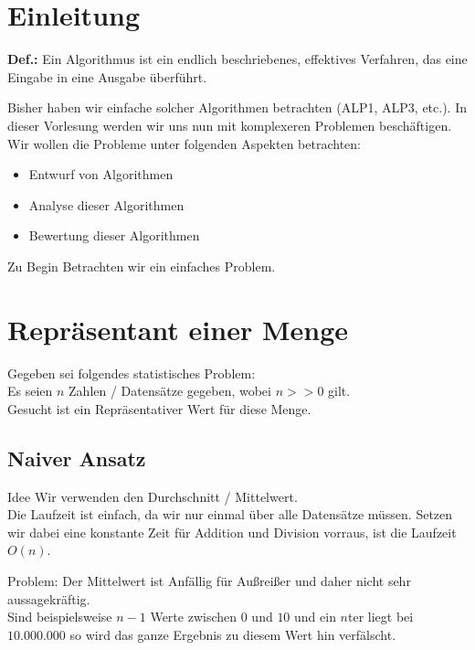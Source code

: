 \section{Einleitung}

\begin{description}

\item{\textbf{Def.:}} Ein Algorithmus ist ein endlich beschriebenes, effektives Verfahren, das eine Eingabe in eine Ausgabe überführt.

\end{description}

Bisher haben wir einfache solcher Algorithmen betrachten (ALP1, ALP3, etc.). In dieser Vorlesung werden wir uns nun mit komplexeren Problemen beschäftigen. Wir wollen die Probleme unter folgenden Aspekten betrachten:

\begin{itemize}

\item Entwurf von Algorithmen

\item Analyse dieser Algorithmen

\item Bewertung dieser Algorithmen

\end{itemize}

Zu Begin Betrachten wir ein einfaches Problem.

\section{Repräsentant einer Menge}

Gegeben sei folgendes statistisches Problem:\\
Es seien $n$ Zahlen / Datensätze gegeben, wobei $n >> 0$ gilt.\\
Gesucht ist ein Repräsentativer Wert für diese Menge.

\subsection{Naiver Ansatz}

\begin{description}

\item{Idee} Wir verwenden den Durchschnitt / Mittelwert.\\
Die Laufzeit ist einfach, da wir nur einmal über alle Datensätze müssen. Setzen wir dabei eine konstante Zeit für Addition und Division vorraus, ist die Laufzeit $O(n)$.

\item{Problem:} Der Mittelwert ist Anfällig für Außreißer und daher nicht sehr aussagekräftig.\\
Sind beispielsweise $n-1$ Werte zwischen $0$ und $10$ und ein $n$ter liegt bei $10.000.000$ so wird das ganze Ergebnis zu diesem Wert hin verfälscht.

\end{description}

